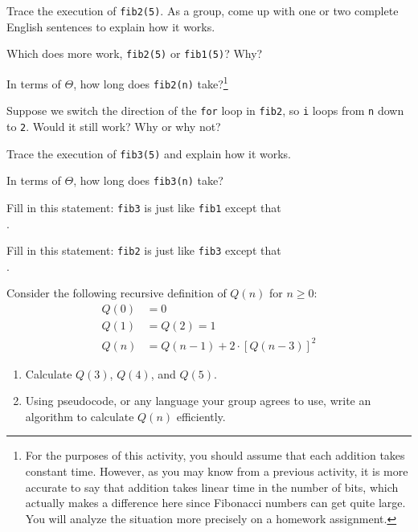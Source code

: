 \documentclass{tufte-handout}
\begin{document}
\begin{questions}
\item Trace the execution of \verb|fib2(5)|. As a group, come up with
  one or two complete English sentences to explain how it
  works. \vspace{1in}
\item Which does more work, \verb|fib2(5)| or \verb|fib1(5)|?  Why?
\item In terms of $\Theta$, how long does \verb|fib2(n)|
  take?\footnote{For the purposes of this activity, you should assume
    that each addition takes constant time.  However, as you may know from
    a previous activity, it is more accurate to say that addition
    takes linear time in the number of bits, which actually makes a
    difference here since Fibonacci numbers can get quite large.  You
    will analyze the situation more precisely on a homework assignment.}
\item Suppose we switch the direction of the \verb|for| loop in
  \verb|fib2|, so \verb|i| loops from \verb|n| down to \verb|2|.
  Would it still work?  Why or why not?
\item Trace the execution of \verb|fib3(5)| and explain how it works. \vspace{1in}
\item In terms of $\Theta$, how long does \verb|fib3(n)| take?
\item Fill in this statement: \verb|fib3| is just like \verb|fib1|
  except that \\ \blank.
\item Fill in this statement: \verb|fib2| is just like \verb|fib3|
  except that \\ \blank.
\item Consider the following recursive definition of $Q(n)$ for $n
  \geq 0$:
  \begin{align*}
    Q(0) &= 0 \\
    Q(1) &= Q(2) = 1 \\
    Q(n) &= Q(n-1) + 2 \cdot \left[Q(n - 3)\right]^2
  \end{align*}
  \begin{enumerate}[label=(\alph*)]
  \item Calculate $Q(3)$, $Q(4)$, and $Q(5)$. \vspace{1in}
  \item Using pseudocode, or any language your group agrees to use, write an
    algorithm to calculate $Q(n)$ efficiently.
  \end{enumerate}
\end{questions}
\end{document}
